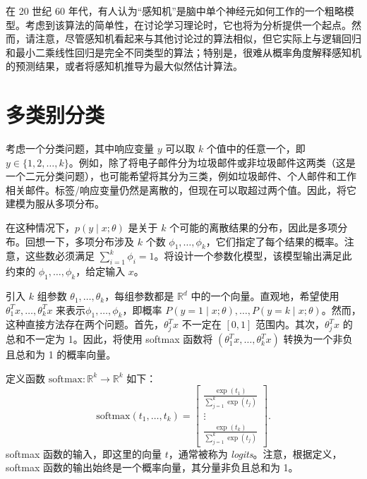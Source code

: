 在 20 世纪 60 年代，有人认为“感知机”是脑中单个神经元如何工作的一个粗略模型。考虑到该算法的简单性，在讨论学习理论时，它也将为分析提供一个起点。然而，请注意，尽管感知机看起来与其他讨论过的算法相似，但它实际上与逻辑回归和最小二乘线性回归是完全不同类型的算法；特别是，很难从概率角度解释感知机的预测结果，或者将感知机推导为最大似然估计算法。


\section{多类别分类}\label{sec:2.3}

考虑一个分类问题，其中响应变量 $y$ 可以取 $k$ 个值中的任意一个，即 $y \in \{1, 2, \dots, k\}$。例如，除了将电子邮件分为垃圾邮件或非垃圾邮件这两类（这是一个二元分类问题），也可能希望将其分为三类，例如垃圾邮件、个人邮件和工作相关邮件。标签/响应变量仍然是离散的，但现在可以取超过两个值。因此，将它建模为服从多项分布。

在这种情况下，$p(y \mid x; \theta)$ 是关于 $k$ 个可能的离散结果的分布，因此是多项分布。回想一下，多项分布涉及 $k$ 个数 $\phi_1, \dots, \phi_k$，它们指定了每个结果的概率。注意，这些数必须满足 $\sum_{i=1}^k \phi_i = 1$。将设计一个参数化模型，该模型输出满足此约束的 $\phi_1, \dots, \phi_k$，给定输入 $x$。

引入 $k$ 组参数 $\theta_1, \dots, \theta_k$，每组参数都是 $\mathbb{R}^d$ 中的一个向量。直观地，希望使用 $\theta_1^T x, \dots, \theta_k^T x$ 来表示$\phi_1, \dots, \phi_k$，即概率 $P(y = 1 \mid x; \theta), \dots, P(y = k \mid x; \theta)$。然而，这种直接方法存在两个问题。首先，$\theta_j^T x$ 不一定在 $[0, 1]$ 范围内。其次，$\theta_j^T x$ 的总和不一定为 1。因此，将使用 softmax 函数将 $(\theta_1^T x, \dots, \theta_k^T x)$ 转换为一个非负且总和为 1 的概率向量。

定义函数 $\text{softmax}: \mathbb{R}^k \to \mathbb{R}^k$ 如下：
\begin{equation}
    \text{softmax}(t_1, \dots, t_k) = 
    \begin{bmatrix} 
        \frac{\exp(t_1)}{\sum_{j=1}^k \exp(t_j)} \\
        \vdots \\
        \frac{\exp(t_k)}{\sum_{j=1}^k \exp(t_j)}
    \end{bmatrix}.
\end{equation}
softmax 函数的输入，即这里的向量 $t$，通常被称为 \textit{logits}。注意，根据定义，softmax 函数的输出始终是一个概率向量，其分量非负且总和为 1。

